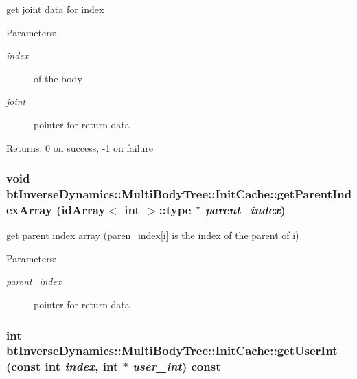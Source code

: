 get joint data for index \begin{Desc}
\item[Parameters:]
\begin{description}
\item[{\em index}]of the body \item[{\em joint}]pointer for return data \end{description}
\end{Desc}
\begin{Desc}
\item[Returns:]0 on success, -1 on failure \end{Desc}
\hypertarget{classbt_inverse_dynamics_1_1_multi_body_tree_1_1_init_cache_e176197bd93ec8b395b9f9c0b538458c}{
\subsubsection[getParentIndexArray]{\setlength{\rightskip}{0pt plus 5cm}void btInverseDynamics::MultiBodyTree::InitCache::getParentIndexArray (idArray$<$ int $>$::type $\ast$ {\em parent\_\-index})}}
\label{classbt_inverse_dynamics_1_1_multi_body_tree_1_1_init_cache_e176197bd93ec8b395b9f9c0b538458c}


get parent index array (paren\_\-index\mbox{[}i\mbox{]} is the index of the parent of i) \begin{Desc}
\item[Parameters:]
\begin{description}
\item[{\em parent\_\-index}]pointer for return data \end{description}
\end{Desc}
\hypertarget{classbt_inverse_dynamics_1_1_multi_body_tree_1_1_init_cache_88ec979065d527a5ee6759e8dfb8a768}{
\subsubsection[getUserInt]{\setlength{\rightskip}{0pt plus 5cm}int btInverseDynamics::MultiBodyTree::InitCache::getUserInt (const int {\em index}, \/  int $\ast$ {\em user\_\-int}) const}}
\label{classbt_inverse_dynamics_1_1_multi_body_tree_1_1_init_cache_88ec979065d527a5ee6759e8dfb8a768}


